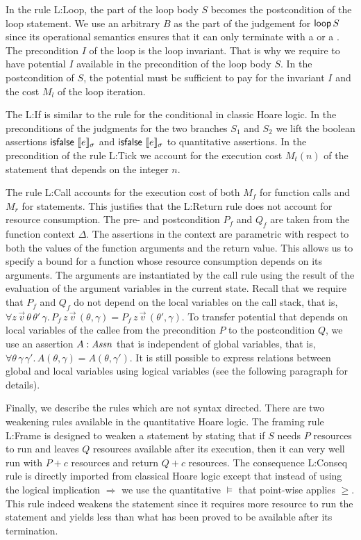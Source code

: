 \documentclass[nocopyrightspace,preprint,pldi]{sigplanconf-pldi15}
\begin{document}
{In the rule {\sc L:Loop}, the  part of the
loop body $S$ becomes the postcondition of the loop statement. We use
an arbitrary $B$ as the  part of the judgement for
$\mathsf{loop}\, S$ since its operational semantics ensures that it can
only terminate with a  or a .  The
precondition $I$ of the loop is the loop invariant.  That is why we
require to have potential $I$ available in the precondition of the
loop body $S$.  In the postcondition of $S$, the potential must be
sufficient to pay for the invariant $I$ and the cost $M_l$ of the loop
iteration.

The {\sc L:If} is similar to the rule for the conditional in classic
Hoare logic.  In the preconditions of the judgments for the two
branches $S_1$ and $S_2$ we lift the boolean assertions
$\mathsf{isfalse}~\llbracket e \rrbracket_{\sigma}$ and $\mathsf{isfalse}~\llbracket e \rrbracket_{\sigma}$ to
quantitative assertions.  In the precondition of the rule {\sc L:Tick}
we account for the execution cost $M_t(n)$ of the 
statement that depends on the integer $n$.

The rule {\sc L:Call} accounts for the execution cost of both $M_f$
for function calls and $M_r$ for  statements.
This justifies that the {\sc L:Return} rule does not account
  for resource consumption. The pre- and postcondition $P_f$ and
$Q_f$ are taken from the function context $\Delta$.  The assertions in
the context are parametric with respect to both the values of the
function arguments and the return value. This allows us to specify a
bound for a function whose resource consumption depends on its
arguments.  The arguments are instantiated by the call rule
using the result of the evaluation of the argument variables in the
current state.  Recall that we require that $P_f$ and $Q_f$ do
  not depend on the local variables on the call stack, that is,
  $\forall z \, \vec v \, \theta \, \theta' \, \gamma . \, P_f \, z \,
  \vec v \, (\theta,\gamma) = P_f \, z \, \vec v \,
  (\theta',\gamma)$. To transfer potential that depends on local
variables of the callee from the precondition $P$ to the postcondition
$Q$, we use an assertion $A : \mathit{Assn}$ that is independent of global
variables, that is, $\forall \theta \, \gamma \, \gamma' . \, A
(\theta,\gamma) = A(\theta,\gamma')$.  It is still possible to express
relations between global and local variables using logical
variables (see the following paragraph for details).

Finally, we describe the rules which are not syntax directed.  There
are two weakening rules available in the quantitative Hoare logic.
The framing rule {\sc L:Frame} is designed to weaken a statement by
stating that if $S$ needs $P$ resources to run and leaves $Q$
resources available after its execution, then it can very well run
with $P + c$ resources and return $Q + c$ resources.  The consequence
{\sc L:Conseq} rule is directly imported from classical Hoare logic
except that instead of using the logical implication $\Rightarrow$ we
use the quantitative $\models$ that point-wise applies $\ge$.  This
rule indeed weakens the statement since it requires more resource to
run the statement and yields less than what has been proved to be
available after its termination.

}
\end{document}
